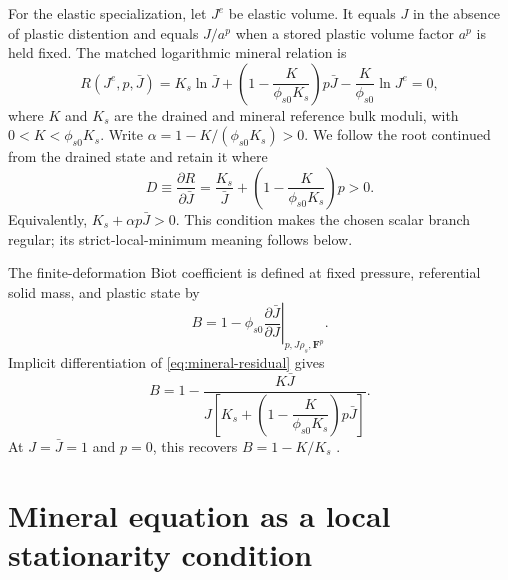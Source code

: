 \documentclass[11pt]{article}
\newcommand{\mbf}[1]{\mathbf{#1}}
\newcommand{\pder}[2]{\frac{\partial #1}{\partial #2}}
\begin{document}
For the elastic specialization, let \(J^e\) be elastic volume.  It equals
\(J\) in the absence of plastic distention and equals \(J/a^p\) when a
stored plastic volume factor \(a^p\) is held fixed.  The matched logarithmic
mineral relation is
\begin{equation}
 R(J^e,p,\bar J)
 =K_s\ln\bar J
 +\left(1-\frac{K}{\phi_{s0}K_s}\right)p\bar J
 -\frac{K}{\phi_{s0}}\ln J^e=0,
 \label{eq:mineral-residual}
\end{equation}
where \(K\) and \(K_s\) are the drained and mineral reference bulk moduli,
with \(0<K<\phi_{s0}K_s\).  Write
\(\alpha=1-K/(\phi_{s0}K_s)>0\).  We follow the root continued from the
drained state and retain it where
\begin{equation}
 D\equiv\pder{R}{\bar J}
 =\frac{K_s}{\bar J}
 +\left(1-\frac{K}{\phi_{s0}K_s}\right)p>0.
 \label{eq:stable-mineral-branch}
\end{equation}
Equivalently, \(K_s+\alpha p\bar J>0\).  This condition makes the chosen
scalar branch regular; its strict-local-minimum meaning follows below.

The finite-deformation Biot coefficient is defined at fixed pressure,
referential solid mass, and plastic state by
\begin{equation}
 B=1-\phi_{s0}\left.\pder{\bar J}{J}\right|_{p,J\rho_s,\mbf F^p}.
 \label{eq:biot-definition}
\end{equation}
Implicit differentiation of \cref{eq:mineral-residual} gives
\begin{equation}
 B=1-
 \frac{K\bar J}
 {J\left[K_s+\left(1-\dfrac{K}{\phi_{s0}K_s}\right)p\bar J\right]}.
 \label{eq:biot-coefficient}
\end{equation}
At \(J=\bar J=1\) and \(p=0\), this recovers \(B=1-K/K_s\)
\citep{biotwillis1957}.

\section{Mineral equation as a local stationarity condition}
\label{sec:stationarity}
\end{document}
